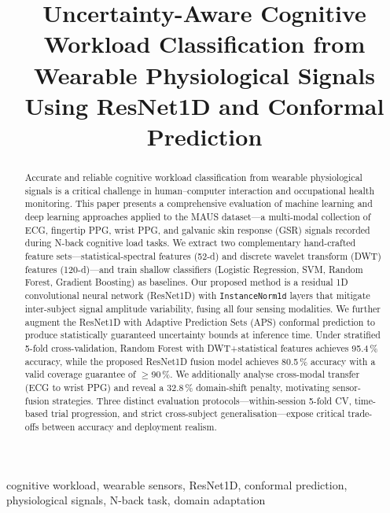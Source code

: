 \documentclass[conference]{IEEEtran}
\begin{document}
\title{Uncertainty-Aware Cognitive Workload Classification from Wearable Physiological Signals Using ResNet1D and Conformal Prediction}

\author{
\and
{}
}

\maketitle

\begin{abstract}
Accurate and reliable cognitive workload classification from wearable physiological signals is a critical challenge in human--computer interaction and occupational health monitoring. This paper presents a comprehensive evaluation of machine learning and deep learning approaches applied to the MAUS dataset---a multi-modal collection of ECG, fingertip PPG, wrist PPG, and galvanic skin response (GSR) signals recorded during N-back cognitive load tasks. We extract two complementary hand-crafted feature sets---statistical-spectral features (52-d) and discrete wavelet transform (DWT) features (120-d)---and train shallow classifiers (Logistic Regression, SVM, Random Forest, Gradient Boosting) as baselines. Our proposed method is a residual 1D convolutional neural network (ResNet1D) with \texttt{InstanceNorm1d} layers that mitigate inter-subject signal amplitude variability, fusing all four sensing modalities. We further augment the ResNet1D with Adaptive Prediction Sets (APS) conformal prediction to produce statistically guaranteed uncertainty bounds at inference time. Under stratified 5-fold cross-validation, Random Forest with DWT+statistical features achieves 95.4\,\% accuracy, while the proposed ResNet1D fusion model achieves 80.5\,\% accuracy with a valid coverage guarantee of $\geq$90\,\%. We additionally analyse cross-modal transfer (ECG to wrist PPG) and reveal a 32.8\,\% domain-shift penalty, motivating sensor-fusion strategies. Three distinct evaluation protocols---within-session 5-fold CV, time-based trial progression, and strict cross-subject generalisation---expose critical trade-offs between accuracy and deployment realism.
\end{abstract}

\begin{IEEEkeywords}
cognitive workload, wearable sensors, ResNet1D, conformal prediction, physiological signals, N-back task, domain adaptation
\end{IEEEkeywords}
\end{document}
